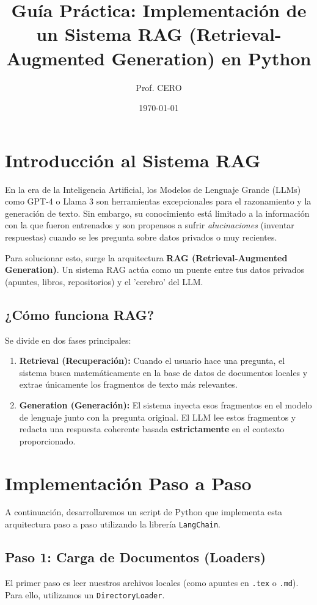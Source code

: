 \documentclass[12pt,a4paper]{article}
\title{Guía Práctica: Implementación de un Sistema RAG (Retrieval-Augmented Generation) en Python}
\author{Prof. CERO}
\date{\today}
\begin{document}
\maketitle
\tableofcontents
\newpage

\section{Introducción al Sistema RAG}

En la era de la Inteligencia Artificial, los Modelos de Lenguaje Grande (LLMs) como GPT-4 o Llama 3 son herramientas excepcionales para el razonamiento y la generación de texto. Sin embargo, su conocimiento está limitado a la información con la que fueron entrenados y son propensos a sufrir \textit{alucinaciones} (inventar respuestas) cuando se les pregunta sobre datos privados o muy recientes.

Para solucionar esto, surge la arquitectura \textbf{RAG (Retrieval-Augmented Generation)}. Un sistema RAG actúa como un puente entre tus datos privados (apuntes, libros, repositorios) y el 'cerebro' del LLM.

\subsection{¿Cómo funciona RAG?}
Se divide en dos fases principales:
\begin{enumerate}
    \item \textbf{Retrieval (Recuperación):} Cuando el usuario hace una pregunta, el sistema busca matemáticamente en la base de datos de documentos locales y extrae únicamente los fragmentos de texto más relevantes.
    \item \textbf{Generation (Generación):} El sistema inyecta esos fragmentos en el modelo de lenguaje junto con la pregunta original. El LLM lee estos fragmentos y redacta una respuesta coherente basada \textbf{estrictamente} en el contexto proporcionado.
\end{enumerate}

\section{Implementación Paso a Paso}

A continuación, desarrollaremos un script de Python que implementa esta arquitectura paso a paso utilizando la librería \texttt{LangChain}.

\subsection{Paso 1: Carga de Documentos (Loaders)}
El primer paso es leer nuestros archivos locales (como apuntes en \texttt{.tex} o \texttt{.md}). Para ello, utilizamos un \texttt{DirectoryLoader}.
\end{document}
